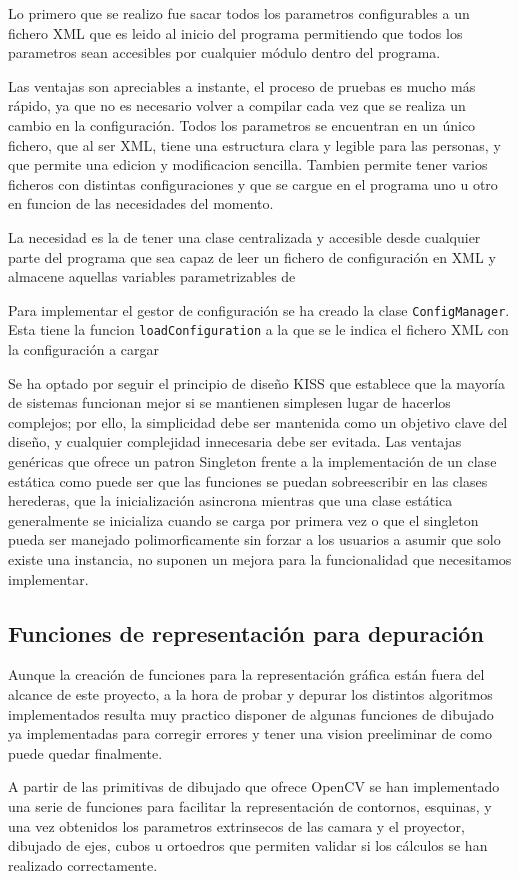 Lo primero que se realizo fue sacar todos los parametros configurables a un fichero \acs{XML} que es leido al inicio del programa permitiendo que todos los parametros sean accesibles por cualquier módulo dentro del programa.

Las ventajas son apreciables a instante, el proceso de pruebas es mucho más rápido, ya que no es necesario volver a compilar cada vez que se realiza un cambio en la configuración. Todos los parametros se encuentran en un único fichero, que al ser \acs{XML}, tiene una estructura clara y legible para las personas, y que permite una edicion y modificacion sencilla. Tambien permite tener varios ficheros con distintas configuraciones y que se cargue en el programa uno u otro en funcion de las necesidades del momento.
 
La necesidad es la de tener una clase centralizada y accesible desde cualquier parte del programa que sea capaz de leer un fichero de configuración en \acs{XML} y almacene aquellas variables parametrizables de

Para implementar el gestor de configuración se ha creado la clase  \texttt{ConfigManager}. Esta tiene la funcion  \texttt{loadConfiguration} a la que se le indica el fichero \acs{XML} con la configuración a cargar 

Se ha optado por seguir el principio de diseño \acs{KISS} que establece que la mayoría de sistemas funcionan mejor si se mantienen simplesen lugar de hacerlos complejos; por ello, la simplicidad debe ser mantenida como un objetivo clave del diseño, y cualquier complejidad innecesaria debe ser evitada. Las ventajas genéricas que ofrece un patron Singleton frente a la implementación de un clase estática como puede ser que las funciones se puedan sobreescribir en las clases herederas, que la inicialización asincrona mientras que una clase estática generalmente se inicializa cuando se carga por primera vez o que el singleton pueda ser manejado polimorficamente sin forzar a los usuarios a asumir que solo existe una instancia, no suponen un mejora para la funcionalidad que necesitamos implementar. 

\subsection{Funciones de representación para depuración}
Aunque la creación de funciones para la representación gráfica están fuera del alcance de este proyecto, a la hora de probar y depurar los distintos algoritmos implementados resulta muy practico disponer de algunas funciones de dibujado ya implementadas para corregir errores y tener una vision preeliminar de como puede quedar finalmente.

A partir de las primitivas de dibujado que ofrece OpenCV se han implementado una serie de funciones para facilitar la representación de contornos, esquinas, y una vez obtenidos los parametros extrinsecos de las camara y el proyector, dibujado de ejes, cubos u ortoedros que permiten validar si los cálculos se han realizado correctamente.





